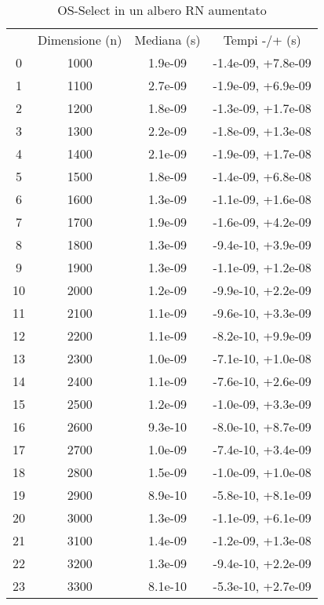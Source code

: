\begin{table}
\centering
\caption{OS-Select in un albero RN aumentato}
\label{OS-Select in un albero RN aumentato}
\begin{adjustbox}{width=1\textwidth/2}
\begin{tabular}{|c|c|c|c|}
\hline
 & Dimensione (n) & Mediana (s) & Tempi -/+ (s) \\
0 & 1000 & 1.9e-09 & -1.4e-09, +7.8e-09 \\
\cline{1-4}
1 & 1100 & 2.7e-09 & -1.9e-09, +6.9e-09 \\
\cline{1-4}
2 & 1200 & 1.8e-09 & -1.3e-09, +1.7e-08 \\
\cline{1-4}
3 & 1300 & 2.2e-09 & -1.8e-09, +1.3e-08 \\
\cline{1-4}
4 & 1400 & 2.1e-09 & -1.9e-09, +1.7e-08 \\
\cline{1-4}
5 & 1500 & 1.8e-09 & -1.4e-09, +6.8e-08 \\
\cline{1-4}
6 & 1600 & 1.3e-09 & -1.1e-09, +1.6e-08 \\
\cline{1-4}
7 & 1700 & 1.9e-09 & -1.6e-09, +4.2e-09 \\
\cline{1-4}
8 & 1800 & 1.3e-09 & -9.4e-10, +3.9e-09 \\
\cline{1-4}
9 & 1900 & 1.3e-09 & -1.1e-09, +1.2e-08 \\
\cline{1-4}
10 & 2000 & 1.2e-09 & -9.9e-10, +2.2e-09 \\
\cline{1-4}
11 & 2100 & 1.1e-09 & -9.6e-10, +3.3e-09 \\
\cline{1-4}
12 & 2200 & 1.1e-09 & -8.2e-10, +9.9e-09 \\
\cline{1-4}
13 & 2300 & 1.0e-09 & -7.1e-10, +1.0e-08 \\
\cline{1-4}
14 & 2400 & 1.1e-09 & -7.6e-10, +2.6e-09 \\
\cline{1-4}
15 & 2500 & 1.2e-09 & -1.0e-09, +3.3e-09 \\
\cline{1-4}
16 & 2600 & 9.3e-10 & -8.0e-10, +8.7e-09 \\
\cline{1-4}
17 & 2700 & 1.0e-09 & -7.4e-10, +3.4e-09 \\
\cline{1-4}
18 & 2800 & 1.5e-09 & -1.0e-09, +1.0e-08 \\
\cline{1-4}
19 & 2900 & 8.9e-10 & -5.8e-10, +8.1e-09 \\
\cline{1-4}
20 & 3000 & 1.3e-09 & -1.1e-09, +6.1e-09 \\
\cline{1-4}
21 & 3100 & 1.4e-09 & -1.2e-09, +1.3e-08 \\
\cline{1-4}
22 & 3200 & 1.3e-09 & -9.4e-10, +2.2e-09 \\
\cline{1-4}
23 & 3300 & 8.1e-10 & -5.3e-10, +2.7e-09 \\

\end{tabular}
\end{adjustbox}
\end{table}
